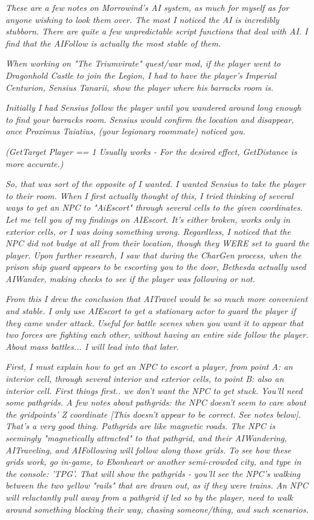 \emph{These are a few notes on Morrowind's AI system, as much for myself
as for anyone wishing to look them over. The most I noticed the AI is
incredibly stubborn. There are quite a few unpredictable script
functions that deal with AI. I find that the AIFollow is actually the
most stable of them.}

\emph{\hfill\break
When working on "The Triumvirate" quest/war mod, if the player went to
Dragonhold Castle to join the Legion, I had to have the player's
Imperial Centurion, Sensius Tanarii, show the player where his barracks
room is.}

\emph{\hfill\break
Initially I had Sensius follow the player until you wandered around long
enough to find your barracks room. Sensius would confirm the location
and disappear, once Proximus Taiatius, (your legionary roommate) noticed
you.}

\emph{(GetTarget Player == 1 Usually works - For the desired effect,
GetDistance is more accurate.)}

\emph{\hfill\break
So, that was sort of the opposite of I wanted. I wanted Sensius to take
the player to their room. When I first actually thought of this, I tried
thinking of several ways to get an NPC to "AiEscort" through several
cells to the given coordinates. Let me tell you of my findings on
AIEscort. It's either broken, works only in exterior cells, or I was
doing something wrong. Regardless, I noticed that the NPC did not budge
at all from their location, though they WERE set to guard the player.
Upon further research, I saw that during the CharGen process, when the
prison ship guard appears to be escorting you to the door, Bethesda
actually used AIWander, making checks to see if the player was following
or not.}

\emph{From this I drew the conclusion that AITravel would be so much
more convenient and stable. I only use AIEscort to get a stationary
actor to guard the player if they came under attack. Useful for battle
scenes when you want it to appear that two forces are fighting each
other, without having an entire side follow the player. About mass
battles... I will lead into that later.}

\emph{\hfill\break
First, I must explain how to get an NPC to escort a player, from point
A: an interior cell, through several interior and exterior cells, to
point B: also an interior cell. First things first.. we don't want the
NPC to get stuck. You'll need some pathgrids. A few notes about
pathgrids: the NPC doesn't seem to care about the gridpoints' Z
coordinate {[}This doesn't appear to be correct. See notes below{]}.
That's a very good thing. Pathgrids are like magnetic roads. The NPC is
seemingly "magnetically attracted" to that pathgrid, and their
AIWandering, AITraveling, and AIFollowing will follow along those grids.
To see how these grids work, go in-game, to Ebonheart or another
semi-crowded city, and type in the console: 'TPG'. That will show the
pathgrids - you'll see the NPC's walking between the two yellow "rails"
that are drawn out, as if they were trains. An NPC will reluctantly pull
away from a pathgrid if led so by the player, need to walk around
something blocking their way, chasing someone/thing, and such
scenarios.}

